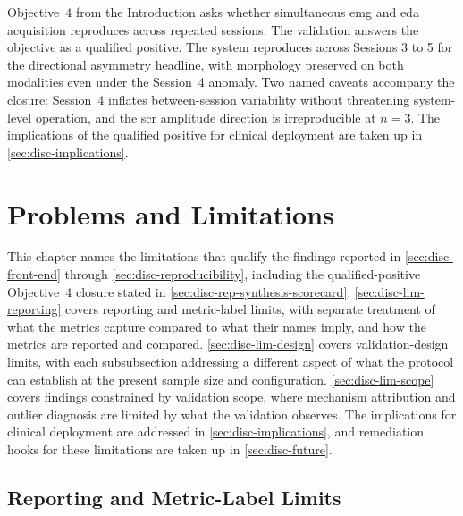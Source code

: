 Objective~4 from the Introduction asks whether simultaneous \gls{emg} and \gls{eda} acquisition reproduces across repeated sessions. The validation answers the objective as a qualified positive. The system reproduces across Sessions 3 to 5 for the directional asymmetry headline, with morphology preserved on both modalities even under the Session~4 anomaly. Two named caveats accompany the closure: Session~4 inflates between-session variability without threatening system-level operation, and the \gls{scr} amplitude direction is irreproducible at $n = 3$. The implications of the qualified positive for clinical deployment are taken up in \autoref{sec:disc-implications}.


\section{Problems and Limitations}
\label{sec:disc-limitations}

This chapter names the limitations that qualify the findings reported in \autoref{sec:disc-front-end} through \autoref{sec:disc-reproducibility}, including the qualified-positive Objective~4 closure stated in \autoref{sec:disc-rep-synthesis-scorecard}. \autoref{sec:disc-lim-reporting} covers reporting and metric-label limits, with separate treatment of what the metrics capture compared to what their names imply, and how the metrics are reported and compared. \autoref{sec:disc-lim-design} covers validation-design limits, with each subsubsection addressing a different aspect of what the protocol can establish at the present sample size and configuration. \autoref{sec:disc-lim-scope} covers findings constrained by validation scope, where mechanism attribution and outlier diagnosis are limited by what the validation observes. The implications for clinical deployment are addressed in \autoref{sec:disc-implications}, and remediation hooks for these limitations are taken up in \autoref{sec:disc-future}.



\subsection{Reporting and Metric-Label Limits} 
\label{sec:disc-lim-reporting}

